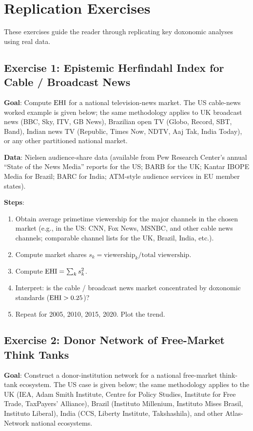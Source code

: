 \chapter{Replication Exercises}
\label{app:replication}

These exercises guide the reader through replicating key doxonomic analyses using real data.

\section*{Exercise 1: Epistemic Herfindahl Index for Cable / Broadcast News}

\textbf{Goal}: Compute $\mathrm{EHI}$ for a national television-news market. The US cable-news worked example is given below; the same methodology applies to UK broadcast news (BBC, Sky, ITV, GB News), Brazilian open TV (Globo, Record, SBT, Band), Indian news TV (Republic, Times Now, NDTV, Aaj Tak, India Today), or any other partitioned national market.

\textbf{Data}: Nielsen audience-share data (available from Pew Research Center's annual ``State of the News Media'' reports for the US; BARB for the UK; Kantar IBOPE Media for Brazil; BARC for India; ATM-style audience services in EU member states).

\textbf{Steps}:
\begin{enumerate}[nosep]
  \item Obtain average primetime viewership for the major channels in the chosen market (e.g., in the US: CNN, Fox News, MSNBC, and other cable news channels; comparable channel lists for the UK, Brazil, India, etc.).
  \item Compute market shares $s_k = \text{viewership}_k / \text{total viewership}$.
  \item Compute $\mathrm{EHI} = \sum_k s_k^2$.
  \item Interpret: is the cable / broadcast news market concentrated by doxonomic standards ($\mathrm{EHI} > 0.25$)?
  \item Repeat for 2005, 2010, 2015, 2020. Plot the trend.
\end{enumerate}

\section*{Exercise 2: Donor Network of Free-Market Think Tanks}

\textbf{Goal}: Construct a donor-institution network for a national free-market think-tank ecosystem. The US case is given below; the same methodology applies to the UK (IEA, Adam Smith Institute, Centre for Policy Studies, Institute for Free Trade, TaxPayers' Alliance), Brazil (Instituto Millenium, Instituto Mises Brasil, Instituto Liberal), India (CCS, Liberty Institute, Takshashila), and other Atlas-Network national ecosystems.

